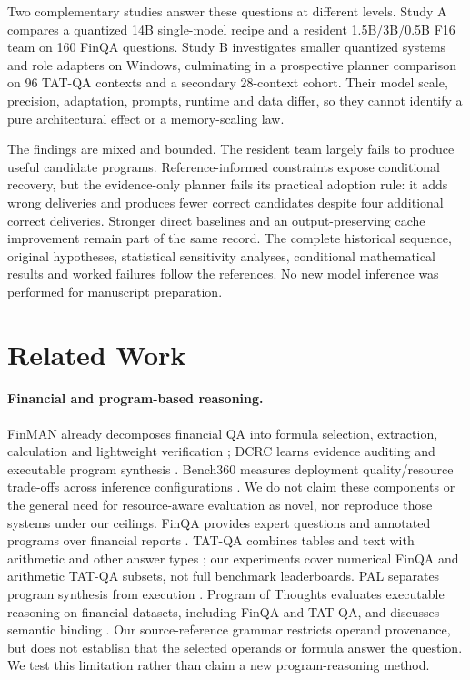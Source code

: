 \documentclass[10pt]{article}
\begin{document}
Two complementary studies answer these questions at different levels. Study A compares a quantized 14B single-model recipe and a resident 1.5B/3B/0.5B F16 team on 160 FinQA questions. Study B investigates smaller quantized systems and role adapters on Windows, culminating in a prospective planner comparison on 96 TAT-QA contexts and a secondary 28-context cohort. Their model scale, precision, adaptation, prompts, runtime and data differ, so they cannot identify a pure architectural effect or a memory-scaling law.

The findings are mixed and bounded. The resident team largely fails to produce useful candidate programs. Reference-informed constraints expose conditional recovery, but the evidence-only planner fails its practical adoption rule: it adds wrong deliveries and produces fewer correct candidates despite four additional correct deliveries. Stronger direct baselines and an output-preserving cache improvement remain part of the same record. The complete historical sequence, original hypotheses, statistical sensitivity analyses, conditional mathematical results and worked failures follow the references. No new model inference was performed for manuscript preparation.\section{Related Work}
\paragraph{Financial and program-based reasoning.}
FinMAN already decomposes financial QA into formula selection, extraction, calculation and lightweight verification \citep{finman}; DCRC learns evidence auditing and executable program synthesis \citep{dcrc}. Bench360 measures deployment quality/resource trade-offs across inference configurations \citep{bench360}. We do not claim these components or the general need for resource-aware evaluation as novel, nor reproduce those systems under our ceilings.
FinQA provides expert questions and annotated programs over financial reports \citep{finqa}. TAT-QA combines tables and text with arithmetic and other answer types \citep{tatqa}; our experiments cover numerical FinQA and arithmetic TAT-QA subsets, not full benchmark leaderboards. PAL separates program synthesis from execution \citep{pal}. Program of Thoughts evaluates executable reasoning on financial datasets, including FinQA and TAT-QA, and discusses semantic binding \citep{pot}. Our source-reference grammar restricts operand provenance, but does not establish that the selected operands or formula answer the question. We test this limitation rather than claim a new program-reasoning method.
\end{document}
